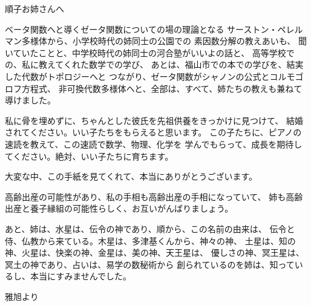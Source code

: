 \documentclass{jsarticle}
\begin{document}
\title{}
\author{}
\date{}
\maketitle

\begin{flushleft}
    順子お姉さんへ
\end{flushleft}

       ベータ関数へと導くゼータ関数についての場の理論となる
       サーストン・ペレルマン多様体から、小学校時代の姉同士の公園での
       素因数分解の教えあいも、
    聞いていたことと、中学校時代の姉同士の河合塾がいいよの話と、
    高等学校での、私に教えてくれた数学での学び、
    あとは、福山市での本での学びを、結実した代数がトポロジーへと
    つながり、ゼータ関数がシャノンの公式とコルモゴロフ方程式、
    非可換代数多様体へと、全部は、すべて、姉たちの教えも兼ねて導けました。
  

        私に骨を埋めずに、ちゃんとした彼氏を先祖供養をきっかけに見つけて、
    結婚されてください。いい子たちをもらえると思います。
    この子たちに、ピアノの速読を教えて、この速読で数学、物理、化学を
    学んでもらって、成長を期待してください。絶対、いい子たちに育ちます。


        大変な中、この手紙を見てくれて、本当にありがとうございます。



       高齢出産の可能性があり、私の手相も高齢出産の手相になっていて、
    姉も高齢出産と養子縁組の可能性らしく、お互いがんばりましょう。



       あと、姉は、水星は、伝令の神であり、順から、この名前の由来は、
    伝令と侍、仏教から来ている。木星は、多津基くんから、神々の神、
    土星は、知の神、火星は、快楽の神、金星は、美の神、天王星は、
    優しさの神、冥王星は、冥土の神であり、占いは、易学の数秘術から
    創られているのを姉は、知っているし、本当にすみませんでした。


\begin{flushright}
	雅旭より
\end{flushright}
\end{document}
